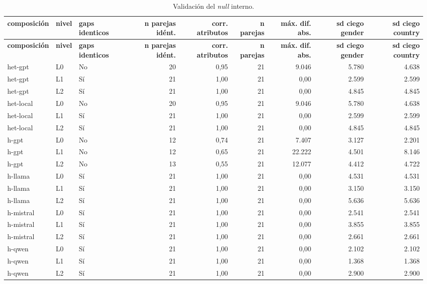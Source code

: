 \begin{landscape}
\scriptsize
\begin{longtable}{lllrrrrrr}
\caption{Validación del \textit{null} interno.}\label{tab:t13}\\
\hline
\textbf{composición} & \textbf{nivel} & \textbf{gaps identicos} & \textbf{n parejas idént.} & \textbf{corr. atributos} & \textbf{n parejas} & \textbf{máx. dif. abs.} & \textbf{sd ciego gender} & \textbf{sd ciego country} \\
\hline
\endfirsthead
\hline
\textbf{composición} & \textbf{nivel} & \textbf{gaps identicos} & \textbf{n parejas idént.} & \textbf{corr. atributos} & \textbf{n parejas} & \textbf{máx. dif. abs.} & \textbf{sd ciego gender} & \textbf{sd ciego country} \\
\hline
\endhead
\hline
\endfoot
het-gpt & L0 & No & 20 & 0,95 & 21 & 9.046 & 5.780 & 4.638 \\
het-gpt & L1 & Sí & 21 & 1,00 & 21 & 0,00 & 2.599 & 2.599 \\
het-gpt & L2 & Sí & 21 & 1,00 & 21 & 0,00 & 4.845 & 4.845 \\
het-local & L0 & No & 20 & 0,95 & 21 & 9.046 & 5.780 & 4.638 \\
het-local & L1 & Sí & 21 & 1,00 & 21 & 0,00 & 2.599 & 2.599 \\
het-local & L2 & Sí & 21 & 1,00 & 21 & 0,00 & 4.845 & 4.845 \\
h-gpt & L0 & No & 12 & 0,74 & 21 & 7.407 & 3.127 & 2.201 \\
h-gpt & L1 & No & 12 & 0,65 & 21 & 22.222 & 4.501 & 8.146 \\
h-gpt & L2 & No & 13 & 0,55 & 21 & 12.077 & 4.412 & 4.722 \\
h-llama & L0 & Sí & 21 & 1,00 & 21 & 0,00 & 4.531 & 4.531 \\
h-llama & L1 & Sí & 21 & 1,00 & 21 & 0,00 & 3.150 & 3.150 \\
h-llama & L2 & Sí & 21 & 1,00 & 21 & 0,00 & 5.636 & 5.636 \\
h-mistral & L0 & Sí & 21 & 1,00 & 21 & 0,00 & 2.541 & 2.541 \\
h-mistral & L1 & Sí & 21 & 1,00 & 21 & 0,00 & 3.855 & 3.855 \\
h-mistral & L2 & Sí & 21 & 1,00 & 21 & 0,00 & 2.661 & 2.661 \\
h-qwen & L0 & Sí & 21 & 1,00 & 21 & 0,00 & 2.102 & 2.102 \\
h-qwen & L1 & Sí & 21 & 1,00 & 21 & 0,00 & 1.368 & 1.368 \\
h-qwen & L2 & Sí & 21 & 1,00 & 21 & 0,00 & 2.900 & 2.900 \\
\end{longtable}
\end{landscape}
